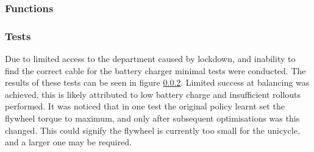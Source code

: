 \documentclass[twoside,twocolumn,12pt]{article}
\begin{document}
\twocolumn
\subsubsection{Functions}



\subsubsection{Tests}
Due to limited access to the department caused by lockdown, and inability to find the correct cable for the battery charger minimal tests were conducted. The results of these tests can be seen in figure \ref{}. Limited success at balancing was achieved, this is likely attributed to low battery charge and insufficient rollouts performed. It was noticed that in one test the original policy learnt set the flywheel torque to maximum, and only after subsequent optimisations was this changed. This could signify the flywheel is currently too small for the unicycle, and a larger one may be required.



\clearpage


\end{document}
